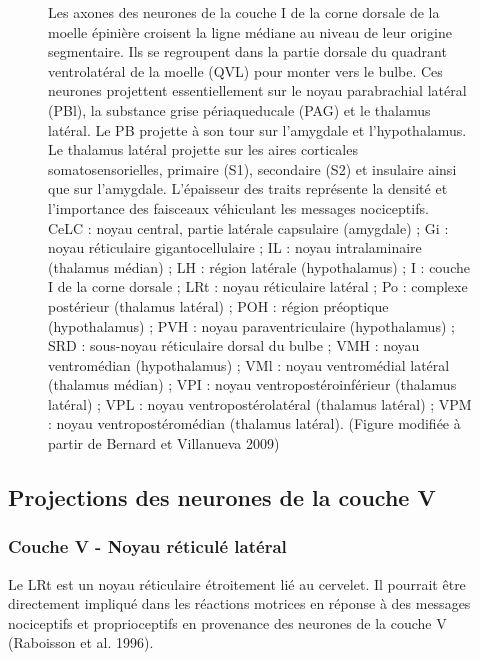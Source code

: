 \documentclass[a4paper,12pt,twoside]{report}
\begin{document}
\begin{figure}[p]
{\protect\parbox[t]{18cm}{
\begin{small}Les axones des neurones de la couche I de la corne dorsale de la moelle épinière croisent la ligne médiane au niveau de leur origine segmentaire. Ils se regroupent dans la partie dorsale du quadrant ventrolatéral de la moelle (QVL) pour monter vers le bulbe. Ces neurones projettent essentiellement sur le noyau parabrachial latéral (PBl), la substance grise périaqueducale (PAG) et le thalamus latéral. Le PB projette à son tour sur l'amygdale et l'hypothalamus. Le thalamus latéral projette sur les aires corticales somatosensorielles, primaire (S1), secondaire (S2) et insulaire ainsi que sur l'amygdale. L'épaisseur des traits représente la densité et l'importance des faisceaux véhiculant les messages nociceptifs.\\
CeLC : noyau central, partie latérale capsulaire (amygdale) ; Gi : noyau réticulaire gigantocellulaire ; IL : noyau intralaminaire (thalamus médian) ; LH : région latérale (hypothalamus) ; I : couche I de la corne dorsale ; LRt : noyau réticulaire latéral ; Po : complexe postérieur (thalamus latéral) ; POH : région préoptique (hypothalamus) ; PVH : noyau paraventriculaire (hypothalamus) ; SRD : sous-noyau réticulaire dorsal du bulbe ; VMH : noyau ventromédian (hypothalamus) ; VMl : noyau ventromédial latéral (thalamus médian) ; VPI : noyau ventropostéroinférieur (thalamus latéral) ; VPL : noyau ventropostérolatéral (thalamus latéral) ; VPM : noyau ventropostéromédian (thalamus latéral). (Figure modifiée à partir de Bernard et Villanueva 2009) \end{small}}}

\label{Figure 2}

\end{figure}

\clearpage

\subsection{Projections des neurones de la couche V}

\subsubsection{Couche V - Noyau réticulé latéral}

Le LRt est un noyau réticulaire étroitement lié au cervelet. Il pourrait être directement impliqué dans les réactions motrices en réponse à des messages nociceptifs et proprioceptifs en provenance des neurones de la couche V (Raboisson et al. 1996). 
\end{document}
